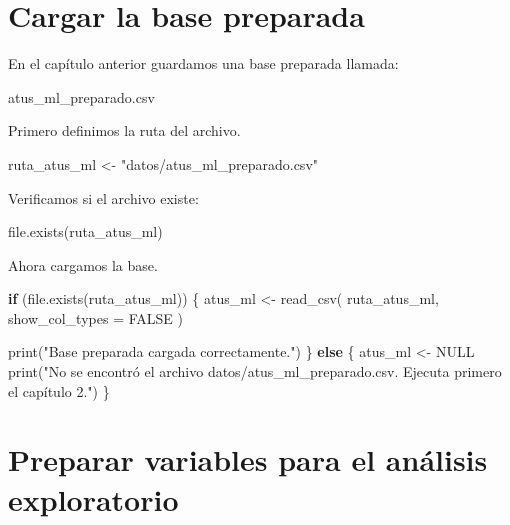 \documentclass[
  11pt,
  letterpaper,
]{book}
\newenvironment{Shaded}{\begin{snugshade}}{\end{snugshade}}
\newcommand{\AttributeTok}[1]{\textcolor[rgb]{0.40,0.45,0.13}{#1}}
\newcommand{\ConstantTok}[1]{\textcolor[rgb]{0.56,0.35,0.01}{#1}}
\newcommand{\ControlFlowTok}[1]{\textcolor[rgb]{0.00,0.23,0.31}{\textbf{#1}}}
\newcommand{\FunctionTok}[1]{\textcolor[rgb]{0.28,0.35,0.67}{#1}}
\newcommand{\NormalTok}[1]{\textcolor[rgb]{0.00,0.23,0.31}{#1}}
\newcommand{\OtherTok}[1]{\textcolor[rgb]{0.00,0.23,0.31}{#1}}
\newcommand{\StringTok}[1]{\textcolor[rgb]{0.13,0.47,0.30}{#1}}
\begin{document}
\section{Cargar la base preparada}\label{cargar-la-base-preparada}

En el capítulo anterior guardamos una base preparada llamada:

\begin{Shaded}
\begin{Highlighting}[]
\NormalTok{atus\_ml\_preparado.csv}
\end{Highlighting}
\end{Shaded}

Primero definimos la ruta del archivo.

\begin{Shaded}
\begin{Highlighting}[]
\NormalTok{ruta\_atus\_ml }\OtherTok{\textless{}{-}} \StringTok{"datos/atus\_ml\_preparado.csv"}
\end{Highlighting}
\end{Shaded}

Verificamos si el archivo existe:

\begin{Shaded}
\begin{Highlighting}[]
\FunctionTok{file.exists}\NormalTok{(ruta\_atus\_ml)}
\end{Highlighting}
\end{Shaded}

Ahora cargamos la base.

\begin{Shaded}
\begin{Highlighting}[]
\ControlFlowTok{if}\NormalTok{ (}\FunctionTok{file.exists}\NormalTok{(ruta\_atus\_ml)) \{}
\NormalTok{  atus\_ml }\OtherTok{\textless{}{-}} \FunctionTok{read\_csv}\NormalTok{(}
\NormalTok{    ruta\_atus\_ml,}
    \AttributeTok{show\_col\_types =} \ConstantTok{FALSE}
\NormalTok{  )}

  \FunctionTok{print}\NormalTok{(}\StringTok{"Base preparada cargada correctamente."}\NormalTok{)}
\NormalTok{\} }\ControlFlowTok{else}\NormalTok{ \{}
\NormalTok{  atus\_ml }\OtherTok{\textless{}{-}} \ConstantTok{NULL}
  \FunctionTok{print}\NormalTok{(}\StringTok{"No se encontró el archivo datos/atus\_ml\_preparado.csv. Ejecuta primero el capítulo 2."}\NormalTok{)}
\NormalTok{\}}
\end{Highlighting}
\end{Shaded}

\section{Preparar variables para el análisis
exploratorio}\label{preparar-variables-para-el-anuxe1lisis-exploratorio}
\end{document}
